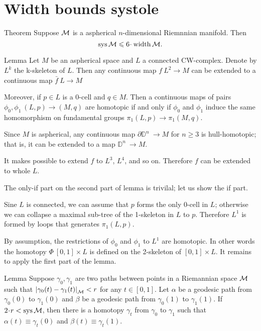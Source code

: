 \section{Width bounds systole}

\begin{thm}{Theorem}\label{thm:sys<width}
Suppose $\mathcal{M}$ is a aspherical $n$-dimensional Riemnnian manifold.
Then 
\[\sys\spc{M}\le 6 \cdot \width \spc{M}.\]
\end{thm}

\begin{thm}{Lemma}\label{lem:aspherical-homotopy}
Let $M$ be an aspherical space and $L$ a connected CW-complex.
Denote by $L^k$ the k-skeleton of $L$.
Then any continuous map $f\:L^2\to M$ can be extended to a continuous map $\bar f\:L\to M$

Moreover, if $p\in L$ is a 0-cell and $q\in M$.
Then a continuous maps of pairs $\phi_0,\phi_1\:(L,p)\to(M,q)$ are homotopic if and only if $\phi_0$ and $\phi_1$ induce the same homomorphism on fundamental groups $\pi_1(L,p)\to\pi_1(M,q)$.
\end{thm}

Since $M$ is aspherical, any continuous map $\partial\mathbb{D}^n\:\to M$ for $n\ge 3$
is hull-homotopic;
that is, it can be extended to a map $\mathbb{D}^n\:\to M$.

It makes possible to extend $f$ to $L^3$, $L^4$, and so on.
Therefore $f$ can be extended to whole $L$.

The only-if part on the second part of lemma is trivilal; let us show the if part.

Sine $L$ is connected, we can assume that $p$ forms the only 0-cell in $L$;
otherwise we can collapse a maximal sub-tree of the 1-skeleton in $L$ to $p$.
Therefore $L^1$ is formed by loops that generates $\pi_1(L,p)$.

By assumption, the restrictions of $\phi_0$ and $\phi_1$ to $L^1$ are homotopic.
In other words the homotopy $\Phi\:[0,1]\times L$ is defined on the 2-skeleton of $[0,1]\times L$.
It remains to apply the first part of the lemma.
\qeds



\begin{thm}{Lemma}\label{lem:sys-homotopy}
Suppose $\gamma_0,\gamma_1$ are two paths between points in a Riemannian space $\mathcal{M}$ such that $\dist{\gamma_0(t)}{\gamma_1(t)}{\spc{M}}<r$ for any $t\in[0,1]$.
Let $\alpha$ be a geodesic path from $\gamma_0(0)$ to $\gamma_1(0)$ and $\beta$ be a geodesic path from $\gamma_0(1)$ to $\gamma_1(1)$. 
If $2\cdot r<\sys\spc{M}$, then there is a homotopy $\gamma_t$ from
$\gamma_0$ to $\gamma_1$ such that $\alpha(t)\equiv \gamma_t(0)$ and $\beta(t)\equiv \gamma_t(1)$.
\end{thm}

